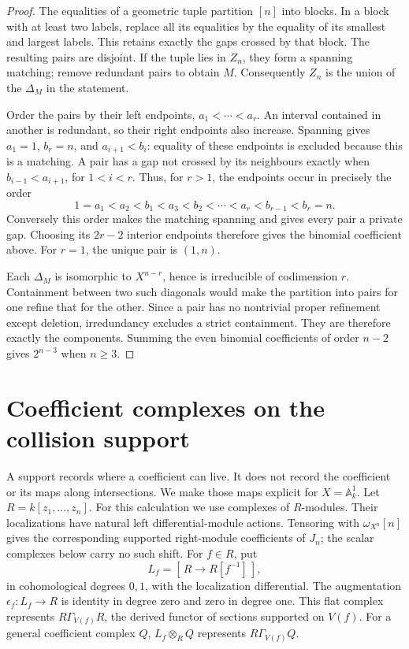 \begin{proof}
The equalities of a geometric tuple partition \([n]\) into blocks.
In a block with at least two labels, replace all its equalities by
the equality of its smallest and largest labels. This retains
exactly the gaps crossed by that block. The resulting pairs are
disjoint. If the tuple lies in \(Z_n\), they form a spanning
matching; remove redundant pairs to obtain \(M\). Consequently
\(Z_n\) is the union of the \(\Delta_M\) in the statement.

Order the pairs by their left endpoints,
\(a_1<\cdots<a_r\). An interval contained in another is
redundant, so their right endpoints also increase. Spanning gives
\(a_1=1\), \(b_r=n\), and \(a_{i+1}<b_i\): equality of
these endpoints is excluded because this is a matching. A pair
has a gap not crossed by its neighbours exactly when
\(b_{i-1}<a_{i+1}\), for \(1<i<r\). Thus, for \(r>1\),
the endpoints occur in precisely the order
\[
 1=a_1<a_2<b_1<a_3<b_2<\cdots<a_r<b_{r-1}<b_r=n.
\]
Conversely this order makes the matching spanning and gives every
pair a private gap. Choosing its \(2r-2\) interior endpoints
therefore gives the binomial coefficient above. For \(r=1\),
the unique pair is \((1,n)\).

Each \(\Delta_M\) is isomorphic to \(X^{n-r}\), hence is
irreducible of codimension \(r\). Containment between two such
diagonals would make the partition into pairs for one refine that
for the other. Since a pair has no nontrivial proper refinement
except deletion, irredundancy excludes a strict containment.
They are therefore exactly the components. Summing the even
binomial coefficients of order \(n-2\) gives \(2^{n-3}\)
when \(n\ge3\).
\end{proof}

\section{Coefficient complexes on the collision support}
\label{v4-sec:word-support-coefficients}

A support records where a coefficient can live. It does not record
the coefficient or its maps along intersections. We make those maps
explicit for \(X=\mathbb A^1_k\). Let
\(R=k[z_1,\ldots,z_n]\). For this calculation we use complexes
of \(R\)-modules. Their localizations have natural left
differential-module actions. Tensoring with \(\omega_{X^n}[n]\)
gives the corresponding supported right-module coefficients of
\(J_n\); the scalar complexes below carry no such shift.
For \(f\in R\), put
\[
 L_f=[\,R\longrightarrow R[f^{-1}]\,],
\]
in cohomological degrees \(0,1\), with the localization differential.
The augmentation \(\epsilon_f:L_f\to R\) is identity in degree
zero and zero in degree one. This flat complex represents
\(R\Gamma_{V(f)}R\), the derived functor of sections supported
on \(V(f)\). For a general coefficient complex \(Q\),
\(L_f\otimes_R Q\) represents \(R\Gamma_{V(f)}Q\).

